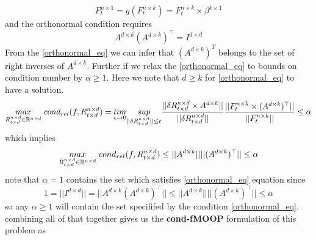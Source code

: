 \begin{equation} \label{g_for_lfm}
P^{n \times 1}_{t} = g(F^{n\times k}_t) = F^{n\times k}_t \times \beta^{k \times 1}
\end{equation}
\newline
and the orthonormal condition requires
\begin{equation} \label{orthonormal_eq}
 A^{d\times k}(A^{d\times k})^{\top} = I^{d\times d}
\end{equation}
\newline
From the \ref{orthonormal_eq} we can infer that $(A^{d\times k})^T$ belongs to the set of right inverses of $A^{d\times k}$. \newline Further if we relax the \ref{orthonormal_eq} to bounds on condition number by $\alpha \ge 1$. Here we note that $d\ge k$ for \ref{orthonormal_eq} to have a solution.
\begin{equation}
    \underset{R^{n\times d}_{t\times d} \in \mathbb{R}^{n\times d}}{max}\hspace{1mm} cond_{rel}(f,R^{n\times d}_{t\times d}) = \underset{\epsilon \to 0}{lim}\underset{||\delta R^{n\times d}_{t\times d}||\le \epsilon}{sup} \frac{||\delta R^{n\times d}_{t\times d}\times A^{d\times k}||}{||\delta R^{n\times d}_{t\times d}||}  \frac{||F^{n\times k}_t \times (A^{d\times k})^{\top} ||}{|| F^{n\times k}_t||}\le \alpha
\end{equation}
which implies\newline
\begin{equation}
    \underset{R^{n\times d}_{t\times d} \in \mathbb{R}^{n\times d}}{max}\hspace{1mm} cond_{rel}(f,R^{n\times d}_{t\times d}) \le ||A^{d\times k}|| ||(A^{d\times k})^{\top} ||\le \alpha
\end{equation}
\newline
note that $\alpha=1$ contains the set which satisfies \ref{orthonormal_eq} equation since 
\begin{equation}
1= || I^{d\times d}||= || A^{d\times k}(A^{d\times k})^{\top} ||  \le || A^{d\times k}||||(A^{d\times k})^{\top} || \le \alpha
\end{equation}\newline
so any $\alpha \ge 1$ will contain the set specififed by the condition \ref{orthonormal_eq}. \newline
combining all of that together gives us the \textbf{cond-fMOOP} formulation of this problem as

